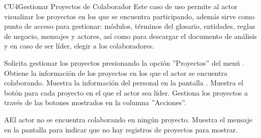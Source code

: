	\begin{UseCase}{CU4}{Gestionar Proyectos de Colaborador}{
		Este caso de uso permite al actor visualizar los proyectos en los que se encuentra participando, además sirve como punto de acceso para gestionar: módulos, términos del glosario, entidades, reglas de negocio, mensajes y actores, así como para descargar el documento de análisis y en caso de ser líder, elegir a los colaboradores.
	}
\end{UseCase}
\begin{UCtrayectoria}
	\UCpaso[\UCactor] Solicita gestionar los proyectos presionando la opción ''Proyectos'' del menú .
	\UCpaso[\UCsist] Obtiene la información de los proyectos en los que el actor se encuentra colaborando. 
	\UCpaso[\UCsist] Muestra la información del personal en la pantalla .
	\UCpaso[\UCsist] Muestra el botón  para cada proyecto en el que el actor sea líder.
	\UCpaso[\UCactor] Gestiona los proyectos a través de las botones mostrados en la columna ''Acciones''. \label{CU4-P5}
\end{UCtrayectoria}		
\begin{UCtrayectoriaA}{A}{El actor no se encuentra colaborando en ningún proyecto.}
	\UCpaso[\UCsist] Muestra el mensaje  en la pantalla  para indicar que no hay registros de proyectos para mostrar.
\end{UCtrayectoriaA}

